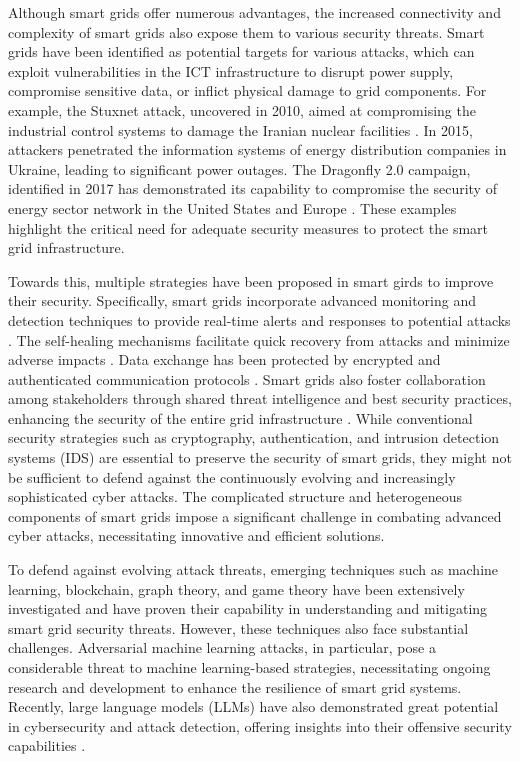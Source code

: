 \documentclass[10pt, journal]{IEEEtran}
\begin{document}
Although smart grids offer numerous advantages, the increased connectivity and complexity of smart grids also expose them to various security threats. Smart grids have been identified as potential targets for various attacks, which can exploit vulnerabilities in the ICT infrastructure to disrupt power supply, compromise sensitive data, or inflict physical damage to grid components. For example, the Stuxnet attack, uncovered in 2010, aimed at compromising the industrial control systems to damage the Iranian nuclear facilities \cite{langner2011stuxnet}. In 2015, attackers penetrated the information systems of energy distribution companies in Ukraine, leading to significant power outages. The Dragonfly 2.0 campaign, identified in 2017 has demonstrated its capability to compromise the security of energy sector network in the United States and Europe \cite{symantec2017dragonfly}. These examples highlight the critical need for adequate security measures to protect the smart grid infrastructure. 

Towards this, multiple strategies have been proposed in smart girds to improve their security. Specifically, smart grids incorporate advanced monitoring and detection techniques to provide real-time alerts and responses to potential attacks \cite{ten2010cybersecurity}. The self-healing mechanisms facilitate quick recovery from attacks and minimize adverse impacts \cite{amin2002security}. Data exchange has been protected by encrypted and authenticated communication protocols \cite{yan2012survey}. Smart grids also foster collaboration among stakeholders through shared threat intelligence and best security practices, enhancing the security of the entire grid infrastructure \cite{zhang2011distributed}. While conventional security strategies such as cryptography, authentication, and intrusion detection systems (IDS) are essential to preserve the security of smart grids, they might not be sufficient to defend against the continuously evolving and increasingly sophisticated cyber attacks. The complicated structure and heterogeneous components of smart grids impose a significant challenge in combating advanced cyber attacks, necessitating innovative and efficient solutions. 

To defend against evolving attack threats, emerging techniques such as machine learning, blockchain, graph theory, and game theory have been extensively investigated and have proven their capability in understanding and mitigating smart grid security threats. However, these techniques also face substantial challenges. Adversarial machine learning attacks, in particular, pose a considerable threat to machine learning-based strategies, necessitating ongoing research and development to enhance the resilience of smart grid systems. Recently, large language models (LLMs) have also demonstrated great potential in cybersecurity and attack detection, offering insights into their offensive security capabilities \cite{shao2024empirical}. 
\end{document}
